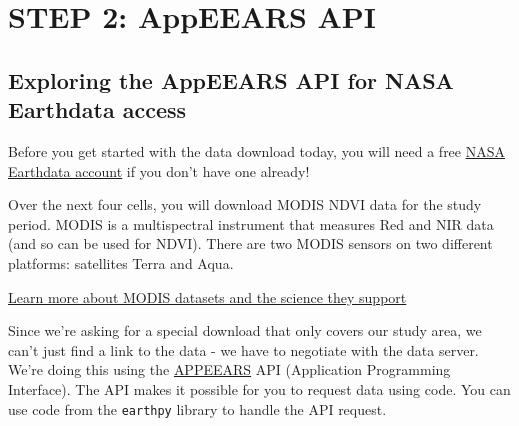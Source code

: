 \documentclass[
  letterpaper,
  DIV=11,
  numbers=noendperiod,
  oneside]{scrreprt}
\begin{document}

\chapter{STEP 2: AppEEARS API}\label{step-2-appeears-api-1}

\section{Exploring the AppEEARS API for NASA Earthdata
access}\label{exploring-the-appeears-api-for-nasa-earthdata-access-1}

Before you get started with the data download today, you will need a
free \href{https://urs.earthdata.nasa.gov/home}{NASA Earthdata account}
if you don't have one already!

Over the next four cells, you will download MODIS NDVI data for the
study period. MODIS is a multispectral instrument that measures Red and
NIR data (and so can be used for NDVI). There are two MODIS sensors on
two different platforms: satellites Terra and Aqua.

\begin{tcolorbox}[enhanced jigsaw, colbacktitle=quarto-callout-color!10!white, opacityback=0, bottomtitle=1mm, toptitle=1mm, bottomrule=.15mm, left=2mm, colframe=quarto-callout-color-frame, leftrule=.75mm, opacitybacktitle=0.6, colback=white, rightrule=.15mm, toprule=.15mm, breakable, titlerule=0mm, title=\textcolor{quarto-callout-color}{\faInfo}\hspace{0.5em}{Read More}, coltitle=black, arc=.35mm]

\href{https://modis.gsfc.nasa.gov/}{Learn more about MODIS datasets and
the science they support}

\end{tcolorbox}

Since we're asking for a special download that only covers our study
area, we can't just find a link to the data - we have to negotiate with
the data server. We're doing this using the
\href{https://appeears.earthdatacloud.nasa.gov/api/}{APPEEARS} API
(Application Programming Interface). The API makes it possible for you
to request data using code. You can use code from the \texttt{earthpy}
library to handle the API request.
\end{document}
